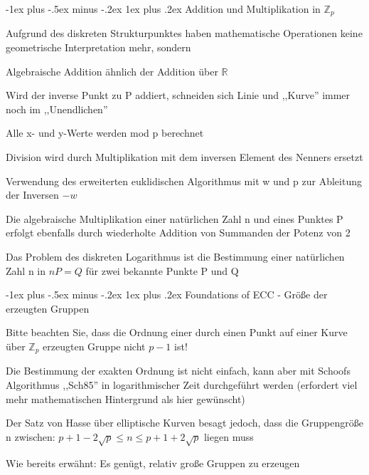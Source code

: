 \documentclass[a4paper]{article}
\makeatletter
\renewcommand{\subsubsection}{\@startsection{subsubsection}{3}{0mm}%
 {-1ex plus -.5ex minus -.2ex}%
 {1ex plus .2ex}%
 {\normalfont\small\bfseries}}
\makeatother
\begin{document}
\begin{multicols}{3}
      \subsubsection{Addition und Multiplikation in
            $\mathbb{Z}_p$}

      \begin{itemize*}
            \item Aufgrund des diskreten Strukturpunktes haben mathematische Operationen
            keine geometrische Interpretation mehr, sondern
            \item Algebraische Addition ähnlich der Addition über
            $\mathbb{R}$
            \item Wird der inverse Punkt zu P addiert, schneiden sich Linie und
            ,,Kurve'' immer noch im ,,Unendlichen''
            \item Alle x- und y-Werte werden mod p berechnet
            \item Division wird durch Multiplikation mit dem inversen Element des
            Nenners ersetzt
            \begin{itemize*}
                  \item Verwendung des erweiterten euklidischen Algorithmus mit w und p zur Ableitung der Inversen $-w$
            \end{itemize*}
            \item Die algebraische Multiplikation einer natürlichen Zahl n und eines
            Punktes P erfolgt ebenfalls durch wiederholte Addition von Summanden
            der Potenz von 2
            \item Das Problem des diskreten Logarithmus ist die Bestimmung einer
            natürlichen Zahl n in $nP=Q$ für zwei bekannte Punkte P und Q
      \end{itemize*}


      \subsubsection{Foundations of ECC - Größe der erzeugten
            Gruppen}

      \begin{itemize*}
            \item Bitte beachten Sie, dass die Ordnung einer durch einen Punkt auf einer
            Kurve über $\mathbb{Z}_p$ erzeugten Gruppe nicht
            $p-1$ ist!
            \item Die Bestimmung der exakten Ordnung ist nicht einfach, kann aber mit
            Schoofs Algorithmus ,,Sch85'' in logarithmischer Zeit durchgeführt
            werden (erfordert viel mehr mathematischen Hintergrund als hier
            gewünscht)
            \item Der Satz von Hasse über elliptische Kurven besagt jedoch, dass die
            Gruppengröße n zwischen: $p+1 -
                  2\sqrt{p}\leq n\leq
                  p+1+2\sqrt{p}$ liegen muss
            \item Wie bereits erwähnt: Es genügt, relativ große Gruppen zu erzeugen
      \end{itemize*}



\end{multicols}
\end{document}
